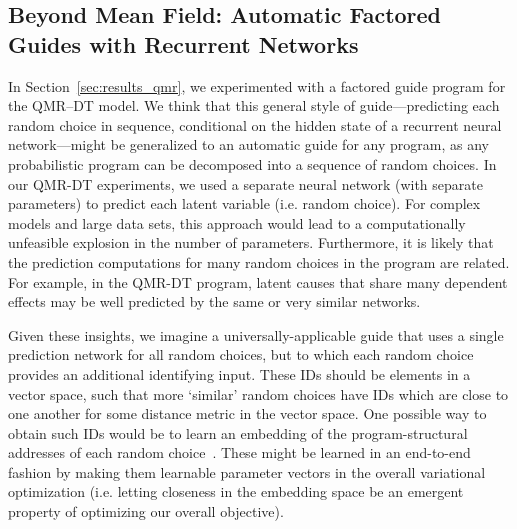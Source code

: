 \subsection{Beyond Mean Field: Automatic Factored Guides with Recurrent Networks}

In Section~\ref{sec:results_qmr}, we experimented with a factored guide program for the QMR–DT model. We think that this general style of guide---predicting each random choice in sequence, conditional on the hidden state of a recurrent neural network---might be generalized to an automatic guide for any program, as any probabilistic program can be decomposed into a sequence of random choices. In our QMR-DT experiments, we used a separate neural network (with separate parameters) to predict each latent variable (i.e. random choice). For complex models and large data sets, this approach would lead to a computationally unfeasible explosion in the number of parameters. Furthermore, it is likely that the prediction computations for many random choices in the program are related. For example, in the QMR-DT program, latent causes that share many dependent effects may be well predicted by the same or very similar networks.

Given these insights, we imagine a universally-applicable guide that uses a single prediction network for all random choices, but to which each random choice provides an additional identifying input. These IDs should be elements in a vector space, such that more `similar' random choices have IDs which are close to one another for some distance metric in the vector space. One possible way to obtain such IDs would be to learn an embedding of the program-structural addresses of each random choice~\cite{Lightweight}. These might be learned in an end-to-end fashion by making them learnable parameter vectors in the overall variational optimization (i.e. letting closeness in the embedding space be an emergent property of optimizing our overall objective).







